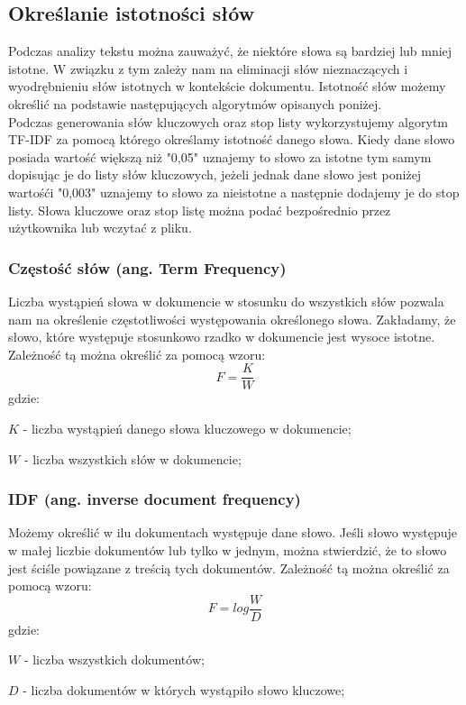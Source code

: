 \documentclass{classrep}
\begin{document}
\subsection{Określanie istotności słów}
Podczas analizy tekstu można zauważyć, że niektóre słowa są bardziej lub mniej istotne. W związku z tym zależy nam
na eliminacji słów nieznaczących i wyodrębnieniu słów istotnych w kontekście dokumentu. Istotność słów możemy określić
na podstawie następujących algorytmów opisanych poniżej.\\
\indent Podczas generowania słów kluczowych oraz stop listy wykorzystujemy algorytm TF-IDF za pomocą którego określamy istotność
danego słowa. Kiedy dane słowo posiada wartość większą niż "0,05" uznajemy to słowo za istotne tym samym dopisując je do
listy słów kluczowych, jeżeli jednak dane słowo jest poniżej wartośći "0,003" uznajemy to słowo za nieistotne a następnie
dodajemy je do stop listy. Słowa kluczowe oraz stop listę można podać bezpośrednio przez użytkownika lub wczytać z pliku.


\subsubsection{Częstość słów (ang. Term Frequency)}
Liczba wystąpień słowa w dokumencie w stosunku do wszystkich słów pozwala nam na określenie częstotliwości występowania
określonego słowa. Zakładamy, że słowo, które występuje stosunkowo rzadko w dokumencie jest wysoce istotne. Zależność tą
można określić za pomocą wzoru:
\begin{equation}
    F=\frac{K}{W}
\end{equation}
gdzie:\\
\begin{description}
    \item $K$ - liczba wystąpień danego słowa kluczowego w dokumencie;
    \item $W$ - liczba wszystkich słów w dokumencie;
\end{description}

\subsubsection{IDF (ang. inverse document frequency)}
Możemy określić w ilu dokumentach występuje dane słowo. Jeśli słowo występuje w małej liczbie dokumentów lub tylko w
jednym, można stwierdzić, że to słowo jest ściśle powiązane z treścią tych dokumentów. Zależność tą można określić za
pomocą wzoru:
\begin{equation}
    F=log \frac{W}{D}
\end{equation}
gdzie:\\
\begin{description}
    \item $W$ - liczba wszystkich dokumentów;
    \item $D$ - liczba dokumentów w których wystąpiło słowo kluczowe;
\end{description}
\end{document}
